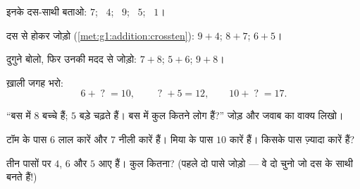 \begin{exercise}[$\star$]\label{exo:g1:addition:3}
इनके दस-साथी बताओ: $7$; \ $4$; \ $9$; \ $5$; \ $1$।
\end{exercise}

\begin{exercise}[$\star$]\label{exo:g1:addition:4}
दस से होकर जोड़ो (\cref{met:g1:addition:crossten}):
$9 + 4$; \quad $8 + 7$; \quad $6 + 5$।
\end{exercise}

\begin{exercise}[$\star$]\label{exo:g1:addition:5}
दुगुने बोलो, फिर उनकी मदद से जोड़ो: $7 + 8$; \quad
$5 + 6$; \quad $9 + 8$।
\end{exercise}

\begin{exercise}[$\star$]\label{exo:g1:addition:6}
ख़ाली जगह भरो:
\[
6 + \;?\; = 10, \qquad
\;?\; + 5 = 12, \qquad
10 + \;?\; = 17 .
\]
\end{exercise}

\begin{exercise}[$\star$]\label{exo:g1:addition:7}
``बस में $8$ बच्चे हैं; $5$ बड़े चढ़ते हैं। बस में कुल कितने लोग
हैं?'' जोड़ और जवाब का वाक्य लिखो।
\end{exercise}

\begin{exercise}[$\star$]\label{exo:g1:addition:8}
टॉम के पास $6$ लाल कारें और $7$ नीली कारें हैं। मिया के पास $10$
कारें हैं। किसके पास ज़्यादा कारें हैं?
\end{exercise}

\begin{exercise}[$\star\star$]\label{exo:g1:addition:9}
तीन पासों पर $4$, $6$ और $5$ आए हैं। कुल कितना? (पहले दो पासे
जोड़ो --- वे दो चुनो जो दस के साथी बनते हैं!)
\end{exercise}
